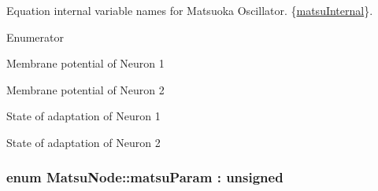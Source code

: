 Equation internal variable names for Matsuoka Oscillator. \{\hyperlink{classMatsuNode_a5899aeb63b46cd45b1dc825ad518289a}{matsu\+Internal}\}. 

\begin{Desc}
\item[Enumerator]\par
\begin{description}
\item[{\em 
X1\hypertarget{classMatsuNode_a5899aeb63b46cd45b1dc825ad518289aabb7f5ae6220c9828e5ec91faf054197c}{}\label{classMatsuNode_a5899aeb63b46cd45b1dc825ad518289aabb7f5ae6220c9828e5ec91faf054197c}
}]Membrane potential of Neuron 1 \item[{\em 
X2\hypertarget{classMatsuNode_a5899aeb63b46cd45b1dc825ad518289aa54105bddbfe3f639d49cbe8f5182c958}{}\label{classMatsuNode_a5899aeb63b46cd45b1dc825ad518289aa54105bddbfe3f639d49cbe8f5182c958}
}]Membrane potential of Neuron 2 \item[{\em 
V1\hypertarget{classMatsuNode_a5899aeb63b46cd45b1dc825ad518289aab4daca084ad9eabfc8de231929477ed6}{}\label{classMatsuNode_a5899aeb63b46cd45b1dc825ad518289aab4daca084ad9eabfc8de231929477ed6}
}]State of adaptation of Neuron 1 \item[{\em 
V2\hypertarget{classMatsuNode_a5899aeb63b46cd45b1dc825ad518289aaec765f1adc3b4253f2d3b131a4a8618f}{}\label{classMatsuNode_a5899aeb63b46cd45b1dc825ad518289aaec765f1adc3b4253f2d3b131a4a8618f}
}]State of adaptation of Neuron 2 \end{description}
\end{Desc}
\subsubsection[{\texorpdfstring{matsu\+Param}{matsuParam}}]{\setlength{\rightskip}{0pt plus 5cm}enum {\bf Matsu\+Node\+::matsu\+Param} \+: unsigned\hspace{0.3cm}{\ttfamily [strong]}}\hypertarget{classMatsuNode_aed801e1d0363292efc99bb02f1911386}{}\label{classMatsuNode_aed801e1d0363292efc99bb02f1911386}


